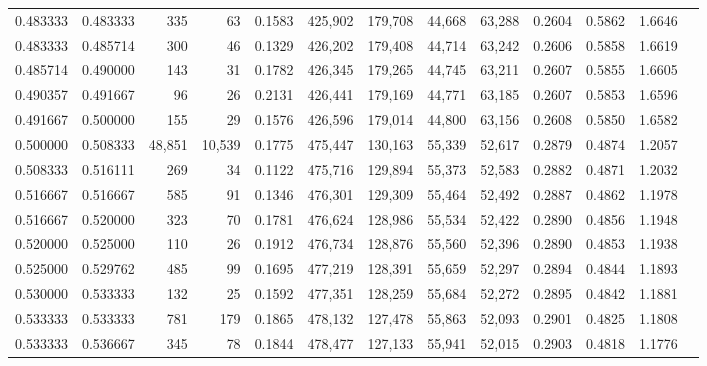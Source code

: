 \begin{tabular}{rrrrrrrrrrrrr}
0.483333 & 0.483333 &    335 &     63 &                                     0.1583 & 425,902 & 179,708 &  44,668 &  63,288 & 0.2604 & 0.5862 & 1.6646 \\
0.483333 & 0.485714 &    300 &     46 &                                     0.1329 & 426,202 & 179,408 &  44,714 &  63,242 & 0.2606 & 0.5858 & 1.6619 \\
0.485714 & 0.490000 &    143 &     31 &                                     0.1782 & 426,345 & 179,265 &  44,745 &  63,211 & 0.2607 & 0.5855 & 1.6605 \\
0.490357 & 0.491667 &     96 &     26 &                                     0.2131 & 426,441 & 179,169 &  44,771 &  63,185 & 0.2607 & 0.5853 & 1.6596 \\
0.491667 & 0.500000 &    155 &     29 &                                     0.1576 & 426,596 & 179,014 &  44,800 &  63,156 & 0.2608 & 0.5850 & 1.6582 \\
0.500000 & 0.508333 & 48,851 & 10,539 &                                     0.1775 & 475,447 & 130,163 &  55,339 &  52,617 & 0.2879 & 0.4874 & 1.2057 \\
0.508333 & 0.516111 &    269 &     34 &                                     0.1122 & 475,716 & 129,894 &  55,373 &  52,583 & 0.2882 & 0.4871 & 1.2032 \\
0.516667 & 0.516667 &    585 &     91 &                                     0.1346 & 476,301 & 129,309 &  55,464 &  52,492 & 0.2887 & 0.4862 & 1.1978 \\
0.516667 & 0.520000 &    323 &     70 &                                     0.1781 & 476,624 & 128,986 &  55,534 &  52,422 & 0.2890 & 0.4856 & 1.1948 \\
0.520000 & 0.525000 &    110 &     26 &                                     0.1912 & 476,734 & 128,876 &  55,560 &  52,396 & 0.2890 & 0.4853 & 1.1938 \\
0.525000 & 0.529762 &    485 &     99 &                                     0.1695 & 477,219 & 128,391 &  55,659 &  52,297 & 0.2894 & 0.4844 & 1.1893 \\
0.530000 & 0.533333 &    132 &     25 &                                     0.1592 & 477,351 & 128,259 &  55,684 &  52,272 & 0.2895 & 0.4842 & 1.1881 \\
0.533333 & 0.533333 &    781 &    179 &                                     0.1865 & 478,132 & 127,478 &  55,863 &  52,093 & 0.2901 & 0.4825 & 1.1808 \\
0.533333 & 0.536667 &    345 &     78 &                                     0.1844 & 478,477 & 127,133 &  55,941 &  52,015 & 0.2903 & 0.4818 & 1.1776 \\

\end{tabular}
